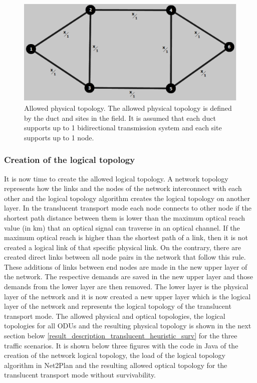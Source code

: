 \begin{figure}[H]
\centering
\includegraphics[width=12cm]{sdf/heuristic/translucent_survivability/figures/allowed_physical}
\caption{Allowed physical topology. The allowed physical topology is defined by the duct and sites in the field. It is assumed that each duct supports up to 1 bidirectional transmission system and each site supports up to 1 node.}
\label{allowed_physical_surv_trans}
\end{figure}

\subsubsection{Creation of the logical topology}

\vspace{11pt}
It is now time to create the allowed logical topology. A network topology represents how the links and the nodes of the network interconnect with each other and the logical topology algorithm creates the logical topology on another layer. In the translucent transport mode each node connects to other node if the shortest path distance between them is lower than the maximum optical reach value (in km) that an optical signal can traverse in an optical channel. If the maximum optical reach is higher than the shortest path of a link, then it is not created a logical link of that specific physical link. On the contrary, there are created direct links between all node pairs in the network that follow this rule. These additions of links between end nodes are made in the new upper layer of the network. The respective demands are saved in the new upper layer and those demands from the lower layer are then removed. The lower layer is the physical layer of the network and it is now created a new upper layer which is the logical layer of the network and represents the logical topology of the translucent transport mode.
The allowed physical and optical topologies, the logical topologies for all ODUs and the resulting physical topology is shown in the next section below \ref{result_description_translucent_heuristic_surv} for the three traffic scenarios. It is shown below three figures with the code in Java of the creation of the network logical topology, the load of the logical topology algorithm in Net2Plan and the resulting allowed optical topology for the translucent transport mode without survivability.


